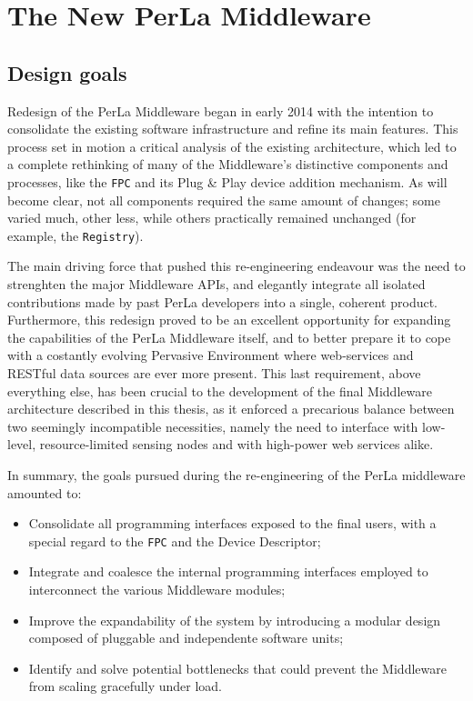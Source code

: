 \chapter{The New PerLa Middleware}
\label{cha:middleware_overview}

\section{Design goals}

Redesign of the PerLa Middleware began in early 2014 with the intention to
consolidate the existing software infrastructure and refine its main features.
This process set in motion a critical analysis of the existing architecture,
which led to a complete rethinking of many of the Middleware's distinctive
components and processes, like the \texttt{FPC} and its Plug \& Play device
addition mechanism. As will become clear, not all components required the same
amount of changes; some varied much, other less, while others practically
remained unchanged (for example, the \texttt{Registry}).

The main driving force that pushed this re-engineering endeavour was the need
to strenghten the major Middleware APIs, and elegantly integrate all isolated
contributions made by past PerLa developers into a single, coherent product.
Furthermore, this redesign proved to be an excellent opportunity for expanding
the capabilities of the PerLa Middleware itself, and to better prepare it to
cope with a costantly evolving Pervasive Environment where web-services and
RESTful data sources are ever more present. This last requirement, above
everything else, has been crucial to the development of the final Middleware
architecture described in this thesis, as it enforced a precarious balance
between two seemingly incompatible necessities, namely the need to interface
with low-level, resource-limited sensing nodes and with high-power web services
alike. 

In summary, the goals pursued during the re-engineering of the PerLa middleware
amounted to:

\begin{itemize}
    
    \item Consolidate all programming interfaces exposed to the final users,
        with a special regard to the \texttt{FPC} and the Device Descriptor;

    \item Integrate and coalesce the internal programming interfaces employed
        to interconnect the various Middleware modules;

    \item Improve the expandability of the system by introducing a modular
        design composed of pluggable and independente software units;

    \item Identify and solve potential bottlenecks that could prevent the
        Middleware from scaling gracefully under load.

\end{itemize}

